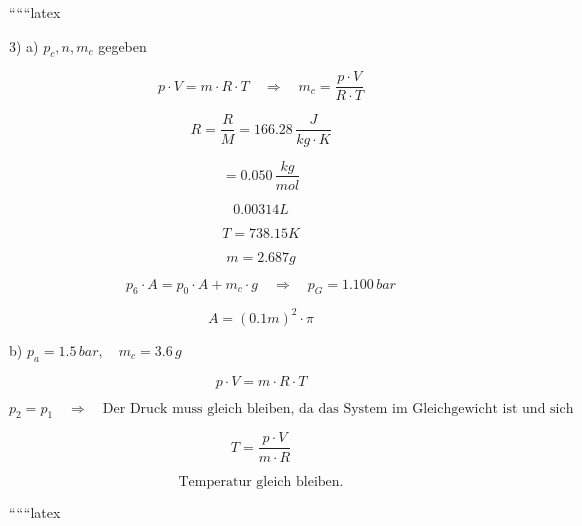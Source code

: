 
``````latex

3) a) $p_c, n, m_c$ gegeben

\[
p \cdot V = m \cdot R \cdot T \quad \Rightarrow \quad m_c = \frac{p \cdot V}{R \cdot T}
\]

\[
R = \frac{R}{M} = 166.28 \, \frac{J}{kg \cdot K}
\]

\[
= 0.050 \, \frac{kg}{mol}
\]

\[
0.00314L
\]

\[
T = 738.15K
\]

\[
m = 2.687g
\]

\[
p_6 \cdot A = p_0 \cdot A + m_c \cdot g \quad \Rightarrow \quad p_G = 1.100 \, bar
\]

\[
A = (0.1m)^2 \cdot \pi
\]

b) $p_a = 1.5 \, bar, \quad m_c = 3.6 \, g$

\[
p \cdot V = m \cdot R \cdot T
\]

\[
p_2 = p_1 \quad \Rightarrow \quad \text{Der Druck muss gleich bleiben, da das System im Gleichgewicht ist und sich weder das Gewicht des Kolbens noch der Luftdruck verändert.}
\]

\[
T = \frac{p \cdot V}{m \cdot R}
\]

\[
\text{Temperatur gleich bleiben.}
\]

``````latex


